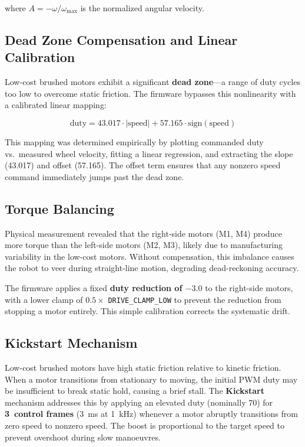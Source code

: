 \documentclass[12pt, a4paper, twoside]{article}
\begin{document}
\noindent where $A = -\omega / \omega_{\max}$ is the normalized angular velocity.

\subsection{Dead Zone Compensation and Linear Calibration}

Low-cost brushed motors exhibit a significant \textbf{dead zone}---a range of duty cycles too low to overcome static friction. The firmware bypasses this nonlinearity with a calibrated linear mapping:

\begin{equation}
    \text{duty} = 43.017 \cdot |\text{speed}| + 57.165 \cdot \text{sign}(\text{speed})
\end{equation}

\noindent This mapping was determined empirically by plotting commanded duty vs.\ measured wheel velocity, fitting a linear regression, and extracting the slope (\SI{43.017}{}) and offset (\SI{57.165}{}). The offset term ensures that any nonzero speed command immediately jumps past the dead zone.

\subsection{Torque Balancing}

Physical measurement revealed that the right-side motors (M1, M4) produce more torque than the left-side motors (M2, M3), likely due to manufacturing variability in the low-cost motors. Without compensation, this imbalance causes the robot to veer during straight-line motion, degrading dead-reckoning accuracy.

The firmware applies a fixed \textbf{duty reduction of $-3.0$} to the right-side motors, with a lower clamp of $0.5\times$ \texttt{DRIVE\_CLAMP\_LOW} to prevent the reduction from stopping a motor entirely. This simple calibration corrects the systematic drift.

\subsection{Kickstart Mechanism}

Low-cost brushed motors have high static friction relative to kinetic friction. When a motor transitions from stationary to moving, the initial PWM duty may be insufficient to break static hold, causing a brief stall. The \textbf{Kickstart} mechanism addresses this by applying an elevated duty (nominally $70$) for \textbf{3~control frames} (\SI{3}{\milli\second} at \SI{1}{\kilo\hertz}) whenever a motor abruptly transitions from zero speed to nonzero speed. The boost is proportional to the target speed to prevent overshoot during slow manoeuvres.
\end{document}
